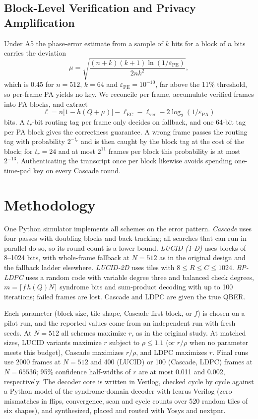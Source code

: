 \documentclass[conference]{IEEEtran}
\begin{document}
\subsection{Block-Level Verification and Privacy Amplification}\label{sec:block}
Under A5 the phase-error estimate from a sample of $k$ bits for a block of $n$ bits carries the deviation
\begin{equation}
\mu=\sqrt{\frac{(n+k)(k+1)\ln(1/\varepsilon_{\mathrm{PE}})}{2nk^{2}}},
\label{eq:mu}
\end{equation}
which is 0.45 for $n=512$, $k=64$ and $\varepsilon_{\mathrm{PE}}=10^{-10}$, far above the 11\% threshold, so per-frame PA yields no key. We reconcile per frame, accumulate verified frames into PA blocks, and extract
\begin{equation}
\ell=n\bigl[1-h(Q+\mu)\bigr]-\ell_{\mathrm{EC}}-\ell_{\mathrm{ver}}-2\log_2(1/\varepsilon_{\mathrm{PA}})
\label{eq:ell}
\end{equation}
bits. A $t_r$-bit routing tag per frame only decides on fallback, and one 64-bit tag per PA block gives the correctness guarantee. A wrong frame passes the routing tag with probability $2^{-t_r}$ and is then caught by the block tag at the cost of the block; for $t_r=24$ and at most $2^{11}$ frames per block this probability is at most $2^{-13}$. Authenticating the transcript once per block likewise avoids spending one-time-pad key on every Cascade round.

\section{Methodology}\label{sec:method}
One Python simulator implements all schemes on the error pattern. \textit{Cascade} uses four passes with doubling blocks and back-tracking; all searches that can run in parallel do so, so its round count is a lower bound. \textit{LUCID (1-D)} uses blocks of 8--1024 bits, with whole-frame fallback at $N=512$ as in the original design and the fallback ladder elsewhere. \textit{LUCID-2D} uses tiles with $8\le R\le C\le1024$. \textit{BP-LDPC} uses a random code with variable degree three and balanced check degrees, $m=\lceil f\,h(Q)N\rceil$ syndrome bits and sum-product decoding with up to 100 iterations; failed frames are lost. Cascade and LDPC are given the true QBER.

Each parameter (block size, tile shape, Cascade first block, or $f$) is chosen on a pilot run, and the reported values come from an independent run with fresh seeds. At $N=512$ all schemes maximize $r$, as in the original study. At matched sizes, LUCID variants maximize $r$ subject to $\rho\le1.1$ (or $r/\rho$ when no parameter meets this budget), Cascade maximizes $r/\rho$, and LDPC maximizes $r$. Final runs use 2000 frames at $N=512$ and 400 (LUCID) or 100 (Cascade, LDPC) frames at $N=65536$; 95\% confidence half-widths of $r$ are at most 0.011 and 0.002, respectively. The decoder core is written in Verilog, checked cycle by cycle against a Python model of the syndrome-domain decoder with Icarus Verilog (zero mismatches in flips, convergence, scan and cycle counts over 520 random tiles of six shapes), and synthesized, placed and routed with Yosys and nextpnr.
\end{document}
